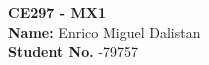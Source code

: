 \documentclass[12pt,a4paper]{article}
\begin{document}
\noindent \textbf{CE297 - MX1} \\
\textbf{Name:} \noindent Enrico Miguel Dalistan \\
\textbf{Student No.} -79757\\
\bigskip
\bigskip
\bigskip
\end{document}
